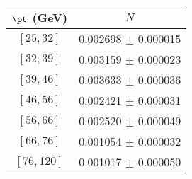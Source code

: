 \begin{tabular}{c||c}
$\pt$ (GeV) & $N$  \\
\hline
$[25, 32]$ & 0.002698 $\pm$ 0.000015\\
$[32, 39]$ & 0.003159 $\pm$ 0.000023\\
$[39, 46]$ & 0.003633 $\pm$ 0.000036\\
$[46, 56]$ & 0.002421 $\pm$ 0.000031\\
$[56, 66]$ & 0.002520 $\pm$ 0.000049\\
$[66, 76]$ & 0.001054 $\pm$ 0.000032\\
$[76, 120]$ & 0.001017 $\pm$ 0.000050\\
\end{tabular}
